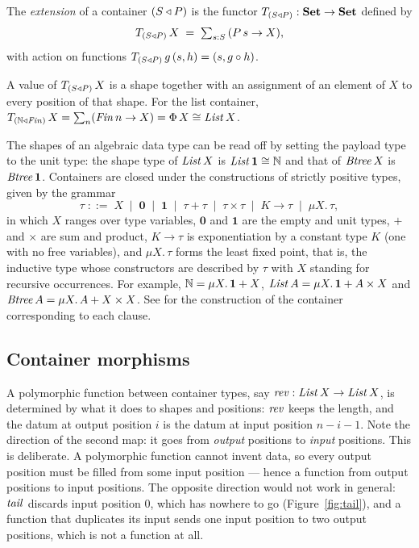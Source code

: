 \documentclass{fundam}
\begin{document}
\begin{definition}[Extension]\label{def:extension}
  The \emph{extension} of a container $(S \triangleleft P)$ is the functor
  $T_{(S \triangleleft P)} : \mathbf{Set} \to \mathbf{Set}$ defined by
  \[
    T_{(S \triangleleft P)}\,X \;=\; \textstyle\sum_{s:S}\, (P\,s \to X),
  \]
  with action on functions $T_{(S \triangleleft P)}\,g\,(s,h) = (s, g \circ h)$.
\end{definition}

A value of $T_{(S \triangleleft P)}\,X$ is a shape together with an assignment of an element of
$X$ to every position of that shape.  For the list container,
$T_{(\mathbb{N} \triangleleft \mathit{Fin})}\,X = \sum_n (\mathit{Fin}\,n \to X) = \Phi\,X \cong \mathit{List}\,X$.

\begin{remark}\label{rem:shapes}
  The shapes of an algebraic data type can be read off by setting the payload type to the
  unit type: the shape type of $\mathit{List}\,X$ is $\mathit{List}\,\mathbf{1} \cong \mathbb{N}$ and that of
  $\mathit{Btree}\,X$ is $\mathit{Btree}\,\mathbf{1}$.  Containers are closed under the
  constructions of strictly positive types, given by the grammar
  \[
    \tau \;::=\; X \;\mid\; \mathbf{0} \;\mid\; \mathbf{1} \;\mid\; \tau + \tau \;\mid\;
    \tau \times \tau \;\mid\; K \to \tau \;\mid\; \mu X.\,\tau ,
  \]
  in which $X$ ranges over type variables, $\mathbf{0}$ and $\mathbf{1}$ are the empty and
  unit types, $+$ and $\times$ are sum and product, $K \to \tau$ is exponentiation by a
  constant type $K$ (one with no free variables), and $\mu X.\,\tau$ forms the least
  fixed point, that is, the inductive type whose constructors are described by $\tau$
  with $X$ standing for recursive occurrences.  For example,
  $\mathbb{N} = \mu X.\, \mathbf{1} + X$, $\mathit{List}\,A = \mu X.\, \mathbf{1} + A \times X$ and
  $\mathit{Btree}\,A = \mu X.\, A + X \times X$.  See \cite{AbbottAltenkirchGhani05} for the
  construction of the container corresponding to each clause.
\end{remark}

\subsection{Container morphisms}\label{sec:morphisms}

A polymorphic function between container types, say $\mathit{rev} : \mathit{List}\,X \to \mathit{List}\,X$, is
determined by what it does to shapes and positions: $\mathit{rev}$ keeps the length, and the datum
at output position $i$ is the datum at input position $n - i - 1$.  Note the direction of
the second map: it goes from \emph{output} positions to \emph{input} positions.  This is
deliberate.  A polymorphic function cannot invent data, so every output position must be
filled from some input position --- hence a function from output positions to input
positions.  The opposite direction would not work in general: $\mathit{tail}$ discards input
position $0$, which has nowhere to go (Figure~\ref{fig:tail}), and a function that
duplicates its input sends one input position to two output positions, which is not a
function at all.
\end{document}
